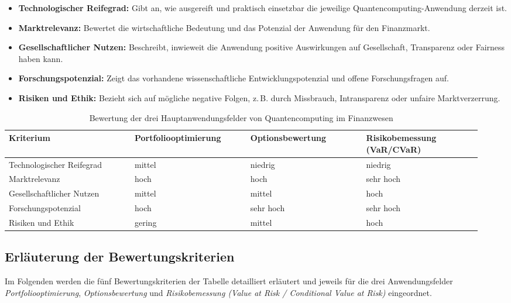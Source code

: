 \begin{itemize}
  \item \textbf{Technologischer Reifegrad:} Gibt an, wie ausgereift und praktisch einsetzbar die jeweilige Quantencomputing-Anwendung derzeit ist.
  \item \textbf{Marktrelevanz:} Bewertet die wirtschaftliche Bedeutung und das Potenzial der Anwendung für den Finanzmarkt.
  \item \textbf{Gesellschaftlicher Nutzen:} Beschreibt, inwieweit die Anwendung positive Auswirkungen auf Gesellschaft, Transparenz oder Fairness haben kann.
  \item \textbf{Forschungspotenzial:} Zeigt das vorhandene wissenschaftliche Entwicklungspotenzial und offene Forschungsfragen auf.
  \item \textbf{Risiken und Ethik:} Bezieht sich auf mögliche negative Folgen, z.\,B. durch Missbrauch, Intransparenz oder unfaire Marktverzerrung.
\end{itemize}

\begin{table}[!htbp]
\centering
\renewcommand{\arraystretch}{1.5}
\begin{tabular}{|p{0.25\linewidth}|p{0.23\linewidth}|p{0.23\linewidth}|p{0.23\linewidth}|}
\hline
\textbf{Kriterium} & \textbf{Portfoliooptimierung} & \textbf{Optionsbewertung} & \textbf{Risikobemessung (VaR/CVaR)} \\
\hline
Technologischer Reifegrad & mittel & niedrig & niedrig \\
\hline
Marktrelevanz & hoch & hoch & sehr hoch \\
\hline
Gesellschaftlicher Nutzen & mittel & mittel & hoch \\
\hline
Forschungspotenzial & hoch & sehr hoch & sehr hoch \\
\hline
Risiken und Ethik & gering & mittel & hoch \\
\hline
\end{tabular}
\caption{Bewertung der drei Hauptanwendungsfelder von Quantencomputing im Finanzwesen}
\label{tab:anwendungsbewertung}
\end{table}


\subsection*{Erläuterung der Bewertungskriterien}

Im Folgenden werden die fünf Bewertungskriterien der Tabelle detailliert erläutert und jeweils für die drei Anwendungsfelder \textit{Portfoliooptimierung}, \textit{Optionsbewertung} und \textit{Risikobemessung (Value at Risk / Conditional Value at Risk)} eingeordnet.

